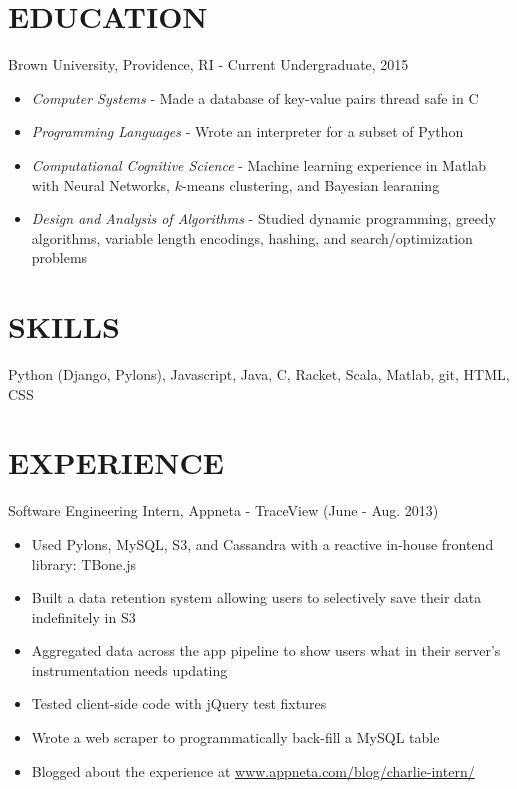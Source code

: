 \documentclass[11pt]{res} %
\begin{document}
\begin{resume}

\section{EDUCATION}
Brown University, Providence, RI - Current Undergraduate, 2015
\begin{itemize} \itemsep -2pt
  \item \emph{Computer Systems} - Made a database of key-value pairs thread safe in C
  \item \emph{Programming Languages} - Wrote an interpreter for a subset of Python
  \item \emph{Computational Cognitive Science} - Machine learning experience in Matlab with Neural Networks, $k$-means clustering, and Bayesian learaning
  \item \emph{Design and Analysis of Algorithms} - Studied dynamic programming, greedy algorithms, variable length encodings, hashing,  and search/optimization problems
\end{itemize}

 \section{SKILLS}
  Python (Django, Pylons), Javascript, Java, C, Racket, Scala, Matlab, git, HTML, CSS

\section{EXPERIENCE}
Software Engineering Intern, 
Appneta - TraceView 
(June - Aug. 2013)
\vspace{0.02in}
   \begin{itemize} \itemsep -2pt
   \item Used Pylons, MySQL, S3, and Cassandra with a reactive in-house frontend library: TBone.js
   \item Built a data retention system allowing users to selectively save their data indefinitely in S3
   \item Aggregated data across the app pipeline to show users what in their server's instrumentation needs updating 
   \item Tested client-side code with jQuery test fixtures
   \item Wrote a web scraper to programmatically back-fill a MySQL table
   \item Blogged about the experience at \href{http://www.appneta.com/blog/charlie-intern/}{www.appneta.com/blog/charlie-intern/}
   \end{itemize}


\end{resume}
\end{document}
